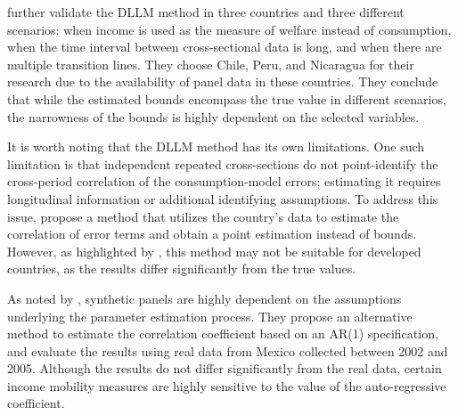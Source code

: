 \documentclass[12pt,a4paper]{article}
\begin{document}
\cite{cruces2015estimating}
further validate the DLLM method in three countries and three different scenarios: when income is used as the measure of welfare instead of consumption, when the time interval between cross-sectional data is long, and when there are multiple transition lines. They choose Chile, Peru, and Nicaragua for their research due to the availability of panel data in these countries. They conclude that while the estimated bounds encompass the true value in different scenarios, the narrowness of the bounds is highly dependent on the selected variables.



It is worth noting that the DLLM method has its own limitations. One such limitation is that independent repeated cross-sections do not point-identify the cross-period correlation of the consumption-model errors; estimating it requires longitudinal information or additional identifying assumptions. To address this issue, \cite{dang2013measuring} propose a method that utilizes the country's data to estimate the correlation of error terms and obtain a point estimation instead of bounds. However, as highlighted by \cite{herault2019valid}, this method may not be suitable for developed countries, as the results differ significantly from the true values.

As noted by \cite{bourguignon2020synthetic}, synthetic panels are highly dependent on the assumptions underlying the parameter estimation process. They propose an alternative method to estimate the correlation coefficient based on an AR(1) specification, and evaluate the results using real data from Mexico collected between 2002 and 2005. Although the results do not differ significantly from the real data, certain income mobility measures are highly sensitive to the value of the auto-regressive coefficient.
\end{document}
